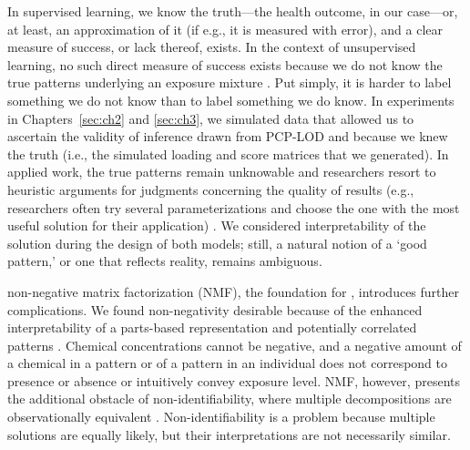 In supervised learning, we know the truth---the health outcome, in our case---or, at least, an approximation of it (if e.g., it is measured with error), and a clear measure of success, or lack thereof, exists. In the context of unsupervised learning, no such direct measure of success exists because we do not know the true patterns underlying an exposure mixture \cite{ISLR}. Put simply, it is harder to label something we do not know than to label something we do know. In experiments in Chapters~\ref{sec:ch2} and \ref{sec:ch3}, we simulated data that allowed us to ascertain the validity of inference drawn from PCP-LOD and \bnmf because we knew the truth (i.e., the simulated loading and score matrices that we generated). In applied work, the true patterns remain unknowable and researchers resort to heuristic arguments for judgments concerning the quality of results (e.g., researchers often try several parameterizations and choose the one with the most useful solution for their application) \cite{friedman2001elements}. We considered interpretability of the solution during the design of both models; still, a natural notion of a `good pattern,' or one that reflects reality, remains ambiguous. 

non-negative matrix factorization (NMF), the foundation for \bnmfc, introduces further complications. We found non-negativity desirable because of the enhanced interpretability of a parts-based representation and potentially correlated patterns \cite{lee1999learning, lee2001}. Chemical concentrations cannot be negative, and a negative amount of a chemical in a pattern or of a pattern in an individual does not correspond to presence or absence or intuitively convey exposure level. NMF, however, presents the additional obstacle of non-identifiability, where multiple decompositions are observationally equivalent \cite{donoho2004does}. Non-identifiability is a problem because multiple solutions are equally likely, but their interpretations are not necessarily similar. 

